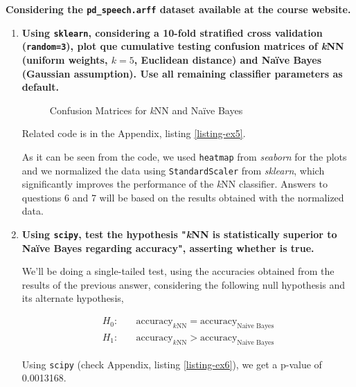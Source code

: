 \documentclass[12pt]{article}
\begin{document}
\textbf{Considering the \texttt{pd\_speech.arff} dataset available at the course website.}

\begin{enumerate}[leftmargin=\labelsep,resume]
    \item {\bfseries
          Using \texttt{sklearn}, considering a 10-fold stratified cross validation
          (\texttt{random=3}), plot que cumulative testing confusion matrices of
          \textit{k}NN (uniform weights, $k = 5$, Euclidean distance) and Naïve Bayes
          (Gaussian assumption). Use all remaining classifier parameters as default.
          }

          \begin{figure}[H]
              \centering
              
              \caption{Confusion Matrices for \textit{k}NN and Naïve Bayes}
              \label{fig:confusion-matrices}
          \end{figure}

          Related code is in the Appendix, listing \ref{listing-ex5}.

          As it can be seen from the code, we used \texttt{heatmap} from \textit{seaborn} for
          the plots and we normalized the data using \texttt{StandardScaler} from \textit{sklearn},
          which significantly improves the performance of the \textit{k}NN classifier.
          Answers to questions 6 and 7 will be based on the results obtained with the
          normalized data.

    \item {\bfseries
          Using \texttt{scipy}, test the hypothesis "\textit{k}NN is statistically
          superior to Naïve Bayes regarding accuracy", asserting whether is true.
          }

          We'll be doing a single-tailed test, using the accuracies obtained from
          the results of the previous answer, considering the following null
          hypothesis and its alternate hypothesis,

          $$
              \begin{aligned}
                  H_0: & \quad\text{accuracy}_{k\text{NN}} = \text{accuracy}_{\text{Naive Bayes}} \\
                  H_1: & \quad\text{accuracy}_{k\text{NN}} > \text{accuracy}_{\text{Naive Bayes}}
              \end{aligned}
          $$

          Using \texttt{scipy} (check Appendix, listing \ref{listing-ex6}), we get a p-value of 0.0013168.


\end{enumerate}
\end{document}
